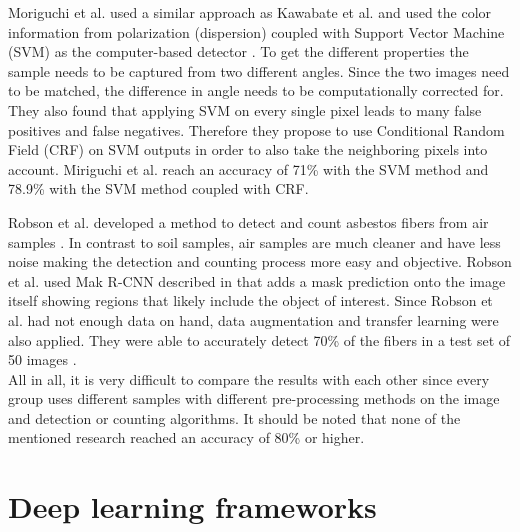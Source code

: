 Moriguchi et al. used a similar approach as Kawabate et al. and used the color information from polarization (dispersion) coupled with Support Vector Machine (SVM) as the computer-based detector \cite{moriguchi2008asbestos}. To get the different properties the sample needs to be captured from two different angles. Since the two images need to be matched, the difference in angle needs to be computationally corrected for. They also found that applying SVM on every single pixel leads to many false positives and false negatives. Therefore they propose to use Conditional Random Field (CRF) on SVM outputs in order to also take the neighboring pixels into account. Miriguchi et al. reach an accuracy of 71\% with the SVM method and 78.9\% with the SVM method coupled with CRF.

Robson et al. developed a method to detect and count asbestos fibers from air samples \cite{robson2018fiac}. In contrast to soil samples, air samples are much cleaner and have less noise making the detection and counting process more easy and objective. Robson et al. used Mak R-CNN described in \cite{he2017mask} that adds a mask prediction onto the image itself showing regions that likely include the object of interest. Since Robson et al. had not enough data on hand, data augmentation and transfer learning were also applied. They were able to accurately detect 70\% of the fibers in a test set of 50 images  \cite{robson2018fiac}. \\


All in all, it is very difficult to compare the results with each other since every group uses different samples with different pre-processing methods on the image and detection or counting algorithms. It should be noted that none of the mentioned research reached an accuracy of 80\% or higher.


\section{Deep learning frameworks}

